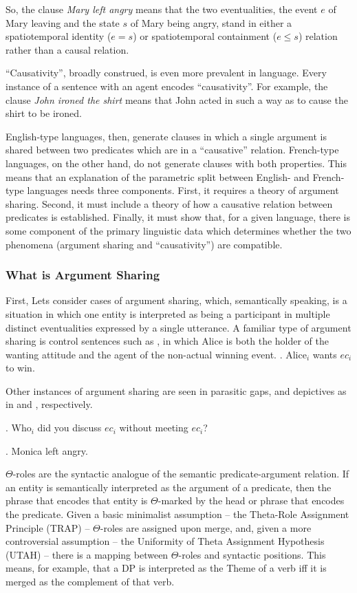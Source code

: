 \documentclass[letterpaper,12pt]{article}
\begin{document}
So, the clause \textit{Mary left angry} means that the two eventualities, the event $e$ of Mary leaving and the state $s$ of Mary being angry, stand in either a spatiotemporal identity ($e=s$) or spatiotemporal containment ($e\leq s$) relation rather than a causal relation.

``Causativity'', broadly construed, is even more prevalent in language.
Every instance of a sentence with an agent encodes ``causativity''.
For example, the clause \textit{John ironed the shirt} means that John acted in such a way as to cause the shirt to be ironed.

English-type languages, then, generate clauses in which a single argument is shared between two predicates which are in a ``causative'' relation.
French-type languages, on the other hand, do not generate clauses with both properties.
This means that an explanation of the parametric split between English- and French-type languages needs three components.
First, it requires a theory of argument sharing.
Second, it must include a theory of how a causative relation between predicates is established.
Finally, it must show that, for a given language, there is some component of the primary linguistic data which determines whether the two phenomena (argument sharing and ``causativity'') are compatible.

\subsubsection{What is Argument Sharing}
First, Lets consider cases of argument sharing, which, semantically speaking, is a situation in which one entity is interpreted as being a participant in multiple distinct eventualities expressed by a single utterance.
A familiar type of argument sharing is control sentences such as \Next, in which Alice is both the holder of the wanting attitude and the agent of the non-actual winning event.
\ex.\label{ex:Control} Alice$_i$ wants $ec_i$ to win.

Other instances of argument sharing are seen in parasitic gaps, and depictives as in \Next and \NNext, respectively.

\ex. Who$_i$ did you discuss $ec_i$ without meeting $ec_i$?

\ex. Monica left angry.

$\Theta$-roles are the syntactic analogue of the semantic predicate-argument relation.
If an entity is semantically interpreted as the argument of a predicate, then the phrase that encodes that entity is $\Theta$-marked by the head or phrase that encodes the predicate.
Given a basic minimalist assumption -- the Theta-Role Assignment Principle (TRAP) \parencite{hornsteinetal2005understanding} -- $\Theta$-roles are assigned upon merge, and, given a more controversial assumption -- the Uniformity of Theta Assignment Hypothesis (UTAH) \parencite{baker1988incorporation}-- there is a mapping between $\Theta$-roles and syntactic positions.
This means, for example, that a DP is interpreted as the Theme of a verb iff it is merged as the complement of that verb.
\end{document}
